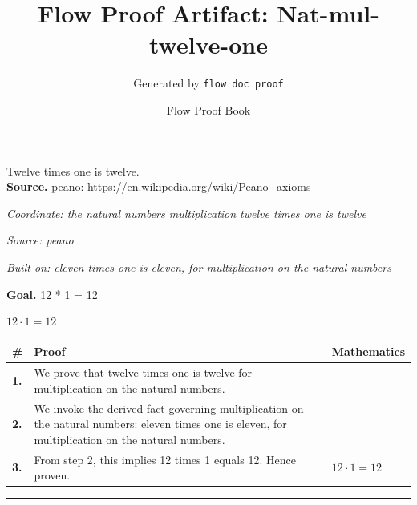 \documentclass[11pt]{article}
\title{Flow Proof Artifact: Nat-mul-twelve-one}
\author{Generated by \texttt{flow doc proof}}
\date{Flow Proof Book}
\theoremstyle{definition}
\begin{document}
\maketitle
Twelve times one is twelve.\\[0.5em]
\textbf{Source.} peano: https://en.wikipedia.org/wiki/Peano\_axioms\\[0.5em]
\bigskip
{}\par
\smallskip\noindent\textit{Coordinate: the natural numbers \cdot multiplication \cdot twelve times one is twelve}\par
\smallskip\noindent\textit{Source: peano}\par
\smallskip\noindent\textit{Built on: eleven times one is eleven, for multiplication on the natural numbers}\par
\medskip
\noindent\textbf{Goal.} 12 * 1 = 12\par
\noindent$\displaystyle 12 \cdot 1 = 12$\par
\medskip
\noindent
\begin{tabular}{@{} >{\raggedright\arraybackslash}p{} >{\raggedright\arraybackslash}p{} >{\raggedleft\arraybackslash}p{} @{}}
\textbf{\#} & \textbf{Proof} & \textbf{Mathematics} \\
\midrule
\textbf{1.} & We prove that twelve times one is twelve for multiplication on the natural numbers. & \\[0.45em]
\textbf{2.} & We invoke the derived fact governing multiplication on the natural numbers: eleven times one is eleven, for multiplication on the natural numbers. & \\[0.45em]
\textbf{3.} & From step 2, this implies 12 times 1 equals 12. Hence proven. & $\displaystyle 12 \cdot 1 = 12$ \\[0.45em]
\bottomrule
\end{tabular}
\label{thm:Nat-multiplication-twelve_times_one_is_twelve}
\par\medskip\hrule
\end{document}
